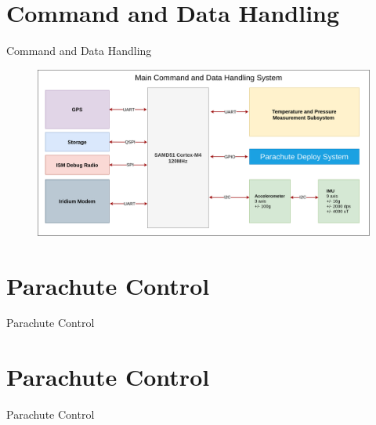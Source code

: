 \documentclass[UKenglish]{beamer}
\begin{document}
\section{Command and Data Handling}
\begin{frame}{Command and Data Handling}
	
	\begin{figure}[h!]
		\centering
		\includegraphics[width=\textwidth]{images/amtps-main-system.png}
	\end{figure}
	
\end{frame}


\section{Parachute Control}
\begin{frame}{Parachute Control}
	
	
\end{frame}


\section{Parachute Control}
\begin{frame}{Parachute Control}
	
	
\end{frame}
\end{document}
